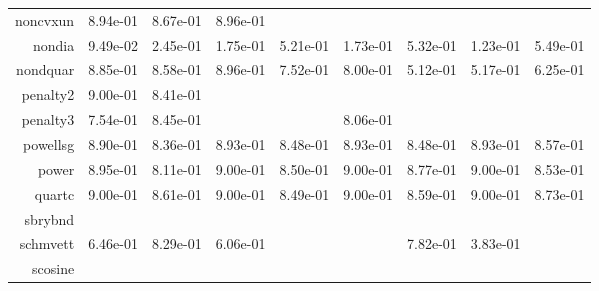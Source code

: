 \begin{tabular}{rrrrrrrrr}
  noncvxun &  8.94e-01 &  8.67e-01 &  8.96e-01 & \cellcolor{black}{\color{white}{ 8.66e-01}} & \cellcolor{black}{\color{white}{ 8.89e-01}} & \cellcolor{black}{\color{white}{ 8.83e-01}} & \cellcolor{black}{\color{white}{ 8.89e-01}} & \cellcolor{black}{\color{white}{ 8.72e-01}} \\
  nondia &  9.49e-02 &  2.45e-01 &  1.75e-01 &  5.21e-01 &  1.73e-01 &  5.32e-01 &  1.23e-01 &  5.49e-01 \\
  nondquar &  8.85e-01 &  8.58e-01 &  8.96e-01 &  7.52e-01 &  8.00e-01 &  5.12e-01 &  5.17e-01 &  6.25e-01 \\
  penalty2 &  9.00e-01 &  8.41e-01 & \cellcolor{black}{\color{white}{      NaN}} & \cellcolor{black}{\color{white}{      NaN}} & \cellcolor{black}{\color{white}{      NaN}} & \cellcolor{black}{\color{white}{      NaN}} & \cellcolor{black}{\color{white}{      NaN}} & \cellcolor{black}{\color{white}{      NaN}} \\
  penalty3 &  7.54e-01 &  8.45e-01 & \cellcolor{black}{\color{white}{ 8.83e-01}} & \cellcolor{black}{\color{white}{ 8.48e-01}} &  8.06e-01 & \cellcolor{black}{\color{white}{ 8.31e-01}} & \cellcolor{black}{\color{white}{ 7.71e-01}} & \cellcolor{black}{\color{white}{ 7.67e-01}} \\
  powellsg &  8.90e-01 &  8.36e-01 &  8.93e-01 &  8.48e-01 &  8.93e-01 &  8.48e-01 &  8.93e-01 &  8.57e-01 \\
  power &  8.95e-01 &  8.11e-01 &  9.00e-01 &  8.50e-01 &  9.00e-01 &  8.77e-01 &  9.00e-01 &  8.53e-01 \\
  quartc &  9.00e-01 &  8.61e-01 &  9.00e-01 &  8.49e-01 &  9.00e-01 &  8.59e-01 &  9.00e-01 &  8.73e-01 \\
  sbrybnd & \cellcolor{black}{\color{white}{ 8.95e-01}} & \cellcolor{black}{\color{white}{ 8.59e-01}} & \cellcolor{black}{\color{white}{ 8.96e-01}} & \cellcolor{black}{\color{white}{ 8.95e-01}} & \cellcolor{black}{\color{white}{ 8.96e-01}} & \cellcolor{black}{\color{white}{ 8.96e-01}} & \cellcolor{black}{\color{white}{ 8.99e-01}} & \cellcolor{black}{\color{white}{ 8.98e-01}} \\
  schmvett &  6.46e-01 &  8.29e-01 &  6.06e-01 & \cellcolor{black}{\color{white}{ 6.50e-01}} & \cellcolor{black}{\color{white}{ 4.40e-01}} &  7.82e-01 &  3.83e-01 & \cellcolor{black}{\color{white}{ 6.43e-01}} \\
  scosine & \cellcolor{black}{\color{white}{ 8.90e-01}} & \cellcolor{black}{\color{white}{ 8.56e-01}} & \cellcolor{black}{\color{white}{ 8.90e-01}} & \cellcolor{black}{\color{white}{ 8.56e-01}} & \cellcolor{black}{\color{white}{ 8.75e-01}} & \cellcolor{black}{\color{white}{ 8.55e-01}} & \cellcolor{black}{\color{white}{ 8.91e-01}} & \cellcolor{black}{\color{white}{ 8.56e-01}} \\

\end{tabular}
